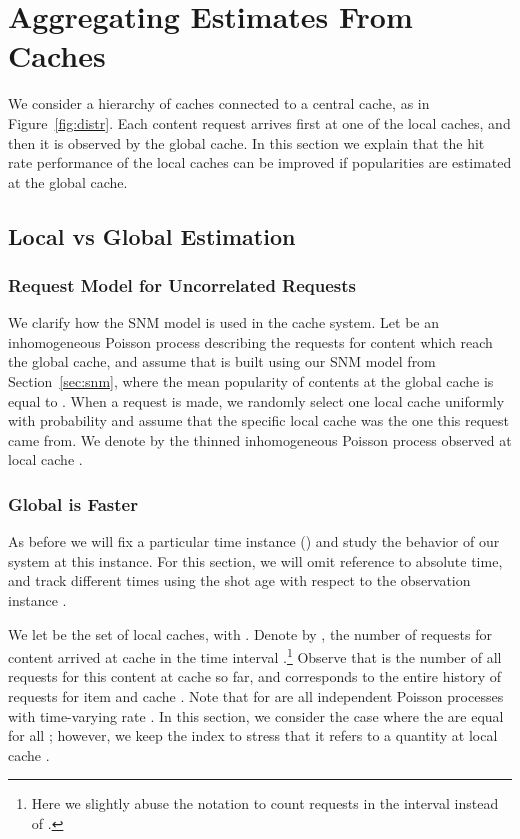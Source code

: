 \documentclass[10pt, conference, letterpaper]{IEEEtran}
\newcommand{\spyros}[1]{{#1}}
\begin{document}
\section{Aggregating Estimates From  Caches}

We consider a hierarchy of  caches connected to a central cache, as in  Figure~\ref{fig:distr}. 
Each content request arrives first at one of the  local caches, and then it is observed by the global cache. 
In this section we explain that the hit rate performance of the local caches can be improved if popularities are estimated at the global cache.





 







\subsection{Local vs Global Estimation}

\subsubsection{Request Model for Uncorrelated Requests}\label{sec:model2}

We clarify how the SNM model is used in the  cache system. Let  be an inhomogeneous Poisson process describing the requests for content  which reach the global cache, and assume that  is built using our SNM model from Section~\ref{sec:snm}, where the mean popularity of contents at the global cache is equal to . 
When a request is made, we randomly select one local cache uniformly with probability  and assume that the specific local cache \spyros {was the one this request came from}. We denote by  the thinned inhomogeneous Poisson process observed at local cache .

\subsubsection{Global is Faster}
As before we will fix a particular time instance () and study the behavior of our system at this instance. For this section, we will omit reference to absolute time, and track different times using the shot age  with respect to the observation instance .

We let  be the set of local caches, with . Denote by , the number of requests for content  arrived at cache  in the time interval .\footnote{Here we slightly abuse the notation  to count requests in the interval  instead of .} Observe that  is the number of all requests for this content at cache  so far, and  corresponds to the entire history of requests for item  and cache . 
Note that  for  are all independent Poisson processes with time-varying rate . In this section, we consider the case where the  are equal for all ; however, we keep the index  to stress that it refers to a quantity at local cache .
\end{document}
